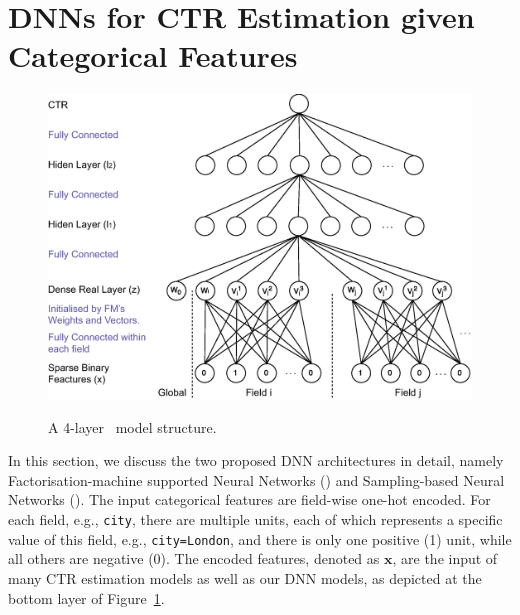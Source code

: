 \documentclass{llncs}
\newcommand{\bs}{\boldsymbol}
\newcommand{\ft}{\texttt}
\newcommand{\fmnn}{\text{FNN}}
\newcommand{\snn}{\text{SNN}}
\begin{document}
\section{DNNs for CTR Estimation given Categorical Features}

\begin{figure}[t]
  \centering
  \vspace{-30pt}
  \includegraphics[width=0.75\columnwidth]{figs/dlctr}\\
  \caption{A 4-layer \fmnn~model structure.}\label{fig:modelone}
\end{figure}

In this section, we discuss the two proposed DNN architectures in detail, namely Factorisation-machine supported Neural Networks (\fmnn) and Sampling-based Neural Networks (\snn).
The input categorical features are field-wise one-hot encoded. For each field, e.g., \ft{city}, there are multiple units, each of which represents a specific value of this field, e.g., \ft{city=London}, and there is only one positive (1) unit, while all others are negative (0). The encoded features, denoted as $\bs{x}$, are the input of many CTR estimation models \cite{richardson2007predicting,lee2012estimating} as well as our DNN models, as depicted at the bottom layer of Figure~\ref{fig:modelone}.
\end{document}
